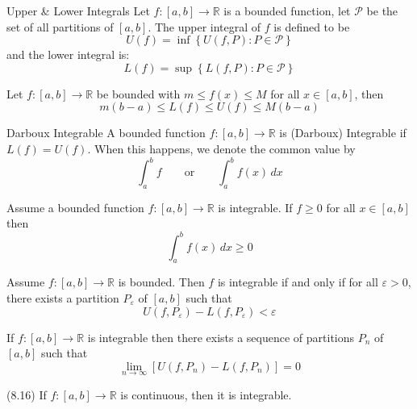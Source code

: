 \documentclass[12pt]{article}
\begin{document}
\begin{definition}{Upper \& Lower Integrals}{}
    Let $ f : \left[ a, b \right] \to \mathbb{R} $ is a bounded function, let $ \mathcal{P} $ be the set of all partitions of $ \left[ a, b \right] $. The upper integral of $ f $ is defined to be
    \[ U \left( f \right) = \inf \left\{ U \left( f, P \right) : P \in \mathcal{P} \right\} \]
    and the lower integral is:
    \[ L \left( f \right) = \sup \left\{ L \left( f, P \right) : P \in \mathcal{P} \right\} \]
\end{definition}
\begin{lemma}{}{}
    Let $ f : \left[ a, b \right] \to \mathbb{R} $ be bounded with $ m \leq f \left( x \right) \leq M $ for all $ x \in \left[ a, b \right] $, then
    \[ m \left( b - a \right) \leq L \left( f \right) \leq U \left( f \right) \leq M \left( b - a \right) \]
\end{lemma}
\begin{definition}{Darboux Integrable}{}
    A bounded function $ f : \left[ a, b \right] \to \mathbb{R} $ is (Darboux) Integrable if $ L \left( f \right) = U \left( f \right) $. When this happens, we denote the common value by
    \[ \int_a^b f \qquad \text{or} \qquad \int_a^b f \left( x \right) \, dx \]
\end{definition}
\begin{proposition}{}{}
    Assume a bounded function $ f : \left[ a, b \right] \to \mathbb{R} $ is integrable. If $ f \geq 0 $ for all $ x \in \left[ a, b \right] $ then
    \[ \int_a^b f \left( x \right) \, dx \geq 0 \]
\end{proposition}
\begin{theorem}{}{}
    Assume $ f : \left[ a, b \right] \to \mathbb{R} $ is bounded. Then $ f $ is integrable if and only if for all $ \varepsilon > 0 $, there exists a partition $ P_\varepsilon $ of $ \left[ a, b \right] $ such that
    \[ U \left( f, P_\varepsilon \right) - L \left( f, P_\varepsilon \right) < \varepsilon \]
\end{theorem}
\begin{corollary}{}{}
    If $ f : \left[ a, b \right] \to \mathbb{R} $ is integrable then there exists a sequence of partitions $ P_n $ of $ \left[ a, b \right] $ such that
    \[ \lim_{n \to \infty} \left[ U \left( f, P_n \right) - L \left( f, P_n \right) \right] = 0 \]
\end{corollary}
\begin{theorem}{(8.16)}{}
    If $ f : \left[ a, b \right] \to \mathbb{R} $ is continuous, then it is integrable.
\end{theorem}
\end{document}
